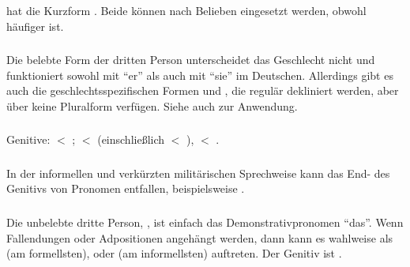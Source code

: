\subsubsection{}  hat die Kurzform . Beide k\"onnen nach
Belieben eingesetzt werden, obwohl  h\"aufiger ist.

\subsubsection{} Die belebte Form der dritten Person  unterscheidet das
Geschlecht nicht und funktioniert sowohl mit "`er"' als auch mit "`sie"' im Deutschen.
Allerdings gibt es auch die geschlechtsspezifischen Formen  und
, die regul\"ar dekliniert werden, aber \"uber keine Pluralform
verf\"ugen. Siehe auch  zur Anwendung.\label{morph:pron:gender}

\subsubsection{} Genitive:  $<$ ;  $<$ 
(einschlie\ss{}lich  $<$ ),  $<$ .
\label{morph:pron:irreg-gen}

\subsubsection{} In der informellen und verk\"urzten milit\"arischen Sprechweise
kann das End- des Genitivs von Pronomen entfallen, beispielsweise
.\label{morph:pron:gen-clipped} 

\subsubsection{} Die unbelebte dritte Person, , ist einfach das
Demonstrativpronomen "`das"'. Wenn Fallendungen oder Adpositionen angeh\"angt werden,
dann kann es wahlweise als  (am formellsten),  oder 
(am informellsten) auftreten. Der Genitiv ist .\label{morph:pron:tsa}

